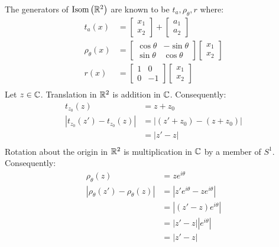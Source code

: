 \documentclass{article}
\begin{document}
\problem
The generators of $\mathrm{Isom}\left(\mathbb{R}^2\right)$ are known to be $t_a, \rho_{\theta}, r$ where:
\begin{equation}
    \begin{split}
        t_a\left(x\right) & = \begin{bmatrix} x_1 \\ x_2\end{bmatrix} + \begin{bmatrix} a_1 \\ a_2\end{bmatrix} \\
        \rho_{\theta}\left(x\right) & = \begin{bmatrix} \cos\theta & -\sin\theta \\ \sin\theta & \cos\theta \end{bmatrix}\begin{bmatrix} x_1 \\ x_2\end{bmatrix} \\
        r\left(x\right) & = \begin{bmatrix} 1 & 0 \\ 0 & -1 \end{bmatrix}\begin{bmatrix} x_1 \\ x_2\end{bmatrix} \\
    \end{split}
\end{equation}
Let $z \in \mathbb{C}$. Translation in $\mathbb{R}^2$ is addition in $\mathbb{C}$. Consequently:
\begin{equation}
    \begin{split}
        t_{z_0}\left(z\right) & = z + z_0 \\
        \left|t_{z_0}\left(z'\right) - t_{z_0}\left(z\right)\right| & = \left|\left(z' + z_0\right) - \left(z + z_0\right)\right| \\
        & = \left|z' - z\right| \\
    \end{split}
\end{equation}
Rotation about the origin in $\mathbb{R}^2$ is multiplication in $\mathbb{C}$ by a member of $S^1$. Consequently:
\begin{equation}
    \begin{split}
        \rho_{\theta}\left(z\right) & = ze^{i\theta} \\
        \left|\rho_{\theta}\left(z'\right) - \rho_{\theta}\left(z\right)\right| & = \left|z'e^{i\theta} - ze^{i\theta}\right| \\
        & = \left|\left(z' - z\right)e^{i\theta}\right| \\
        & = \left|z' - z\right|\left|e^{i\theta}\right| \\
        & = \left|z' - z\right| \\
    \end{split}
\end{equation}
\end{document}
